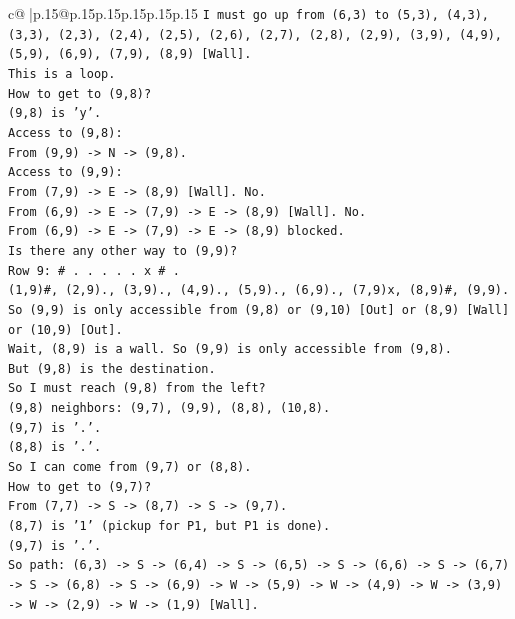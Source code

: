 \documentclass{article}
\begin{document}
{\begin{supertabular}{c@{$\;$}|p{.15\linewidth}@{}p{.15\linewidth}p{.15\linewidth}p{.15\linewidth}p{.15\linewidth}p{.15\linewidth}}
{{{\texttt{I must go up from (6,3) to (5,3), (4,3), (3,3), (2,3), (2,4), (2,5), (2,6), (2,7), (2,8), (2,9), (3,9), (4,9), (5,9), (6,9), (7,9), (8,9) {[}Wall{]}.} \\
\texttt{This is a loop.} \\
\texttt{How to get to (9,8)?} \\
\texttt{(9,8) is 'y'.} \\
\texttt{Access to (9,8):} \\
\texttt{From (9,9) {-}> N {-}> (9,8).} \\
\texttt{Access to (9,9):} \\
\texttt{From (7,9) {-}> E {-}> (8,9) {[}Wall{]}. No.} \\
\texttt{From (6,9) {-}> E {-}> (7,9) {-}> E {-}> (8,9) {[}Wall{]}. No.} \\
\texttt{From (6,9) {-}> E {-}> (7,9) {-}> E {-}> (8,9) blocked.} \\
\texttt{Is there any other way to (9,9)?} \\
\texttt{Row 9: \# . . . . . x \# .} \\
\texttt{(1,9)\#, (2,9)., (3,9)., (4,9)., (5,9)., (6,9)., (7,9)x, (8,9)\#, (9,9).} \\
\texttt{So (9,9) is only accessible from (9,8) or (9,10) {[}Out{]} or (8,9) {[}Wall{]} or (10,9) {[}Out{]}.} \\
\texttt{Wait, (8,9) is a wall. So (9,9) is only accessible from (9,8).} \\
\texttt{But (9,8) is the destination.} \\
\texttt{So I must reach (9,8) from the left?} \\
\texttt{(9,8) neighbors: (9,7), (9,9), (8,8), (10,8).} \\
\texttt{(9,7) is '.'.} \\
\texttt{(8,8) is '.'.} \\
\texttt{So I can come from (9,7) or (8,8).} \\
\texttt{How to get to (9,7)?} \\
\texttt{From (7,7) {-}> S {-}> (8,7) {-}> S {-}> (9,7).} \\
\texttt{(8,7) is '1' (pickup for P1, but P1 is done).} \\
\texttt{(9,7) is '.'.} \\
\texttt{So path: (6,3) {-}> S {-}> (6,4) {-}> S {-}> (6,5) {-}> S {-}> (6,6) {-}> S {-}> (6,7) {-}> S {-}> (6,8) {-}> S {-}> (6,9) {-}> W {-}> (5,9) {-}> W {-}> (4,9) {-}> W {-}> (3,9) {-}> W {-}> (2,9) {-}> W {-}> (1,9) {[}Wall{]}.} \\
}}}
\end{supertabular}}
\end{document}
